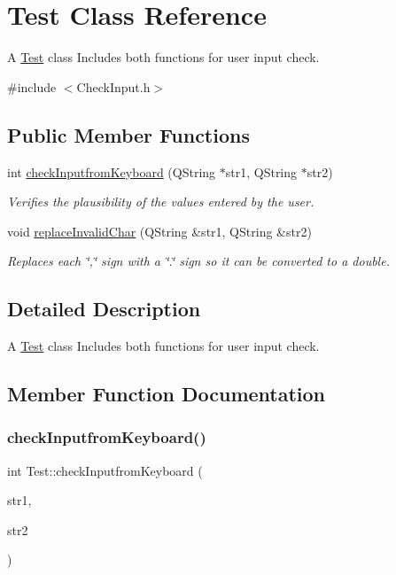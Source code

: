 \hypertarget{classTest}{}\section{Test Class Reference}
\label{classTest}


A \hyperlink{classTest}{Test} class Includes both functions for user input check.  




{\ttfamily \#include $<$Check\+Input.\+h$>$}

\subsection*{Public Member Functions}
\begin{DoxyCompactItemize}
\item 
int \hyperlink{classTest_a3b223ab01f34445e73b914b48a2ff7fc}{check\+Inputfrom\+Keyboard} (Q\+String $\ast$str1, Q\+String $\ast$str2)
\begin{DoxyCompactList}\small\item\em Verifies the plausibility of the values entered by the user. \end{DoxyCompactList}\item 
void \hyperlink{classTest_a83a0f09e6583bf623f84f0caa50342d9}{replace\+Invalid\+Char} (Q\+String \&str1, Q\+String \&str2)
\begin{DoxyCompactList}\small\item\em Replaces each \char`\"{},\char`\"{} sign with a \char`\"{}.\char`\"{} sign so it can be converted to a double. \end{DoxyCompactList}\end{DoxyCompactItemize}


\subsection{Detailed Description}
A \hyperlink{classTest}{Test} class Includes both functions for user input check. 

\subsection{Member Function Documentation}
\mbox{\label{classTest_a3b223ab01f34445e73b914b48a2ff7fc}} 
\subsubsection{\texorpdfstring{check\+Inputfrom\+Keyboard()}{checkInputfromKeyboard()}}
{\footnotesize\ttfamily int Test\+::check\+Inputfrom\+Keyboard (\begin{DoxyParamCaption}\item[{Q\+String $\ast$}]{str1,  }\item[{Q\+String $\ast$}]{str2 }\end{DoxyParamCaption})}



